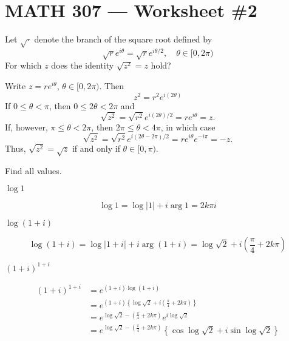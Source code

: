 \documentclass[12pt]{exam}
\begin{document}
\section*{MATH 307 --- Worksheet \#2 }

\begin{questions}
    \setlength\itemsep{1.25em}
    \setlength\parskip{1em}

    \question
    Let $\sqrt{\cdot}$ denote the branch of the square root defined by
    \[
        \sqrt re^{i\theta} = \sqrt re^{i\theta/2},\quad \theta\in [0,2\pi)
    \]
    For which $z$ does the identity $\sqrt{z^2}=z$ hold?

    \begin{solution}
        Write $z=re^{i\theta}$, $\theta\in[0,2\pi)$. Then
        \[
            z^2 = r^2e^{i(2\theta)}
        \]
        If $0\leq \theta < \pi$, then $0\leq 2\theta < 2\pi$ and
        \[
            \sqrt {z^2} = \sqrt{r^2}e^{i(2\theta)/2} = re^{i\theta}=z.
        \]
        If, however, $\pi\leq \theta < 2\pi$, then $2\pi\leq \theta < 4\pi$,
        in which case
        \[
            \sqrt {z^2} = \sqrt{r^2}e^{i(2\theta-2\pi)/2} = re^{i\theta}e^{-i\pi}=-z.
        \]
        Thus, $\sqrt{z^2}=\sqrt z$ if and only if $\theta\in [0,\pi)$.
    
    \end{solution}
    \question
    Find all values.
    \begin{parts}
        \item $\log 1$
        \begin{solution}
            \[
                \log 1 = \log |1| + i\arg 1 = 2k\pi i
            \]
        \end{solution}

        \item $\log (1+i)$
        \begin{solution}
            \[
                \log (1+i) = \log |1+i| + i\arg(1+i) = \log\sqrt 2 + i\left(\frac\pi 4 + 2k\pi\right)
            \]
        \end{solution}

        \item $(1+i)^{1+i}$
        \begin{solution}
            \begin{align*}
                (1+i)^{1+i} &= e^{(1+i)\log(1+i)}\\
                &= e^{(1+i)\left\{\log\sqrt 2 + i\left(\frac\pi 4 + 2k\pi\right)\right\}}\\
                &= e^{\log\sqrt2-\left(\frac\pi4+2k\pi\right)}e^{i\log\sqrt2}\\
                &= e^{\log\sqrt2-\left(\frac\pi4+2k\pi\right)}\left\{\cos\log\sqrt2 + i\sin\log\sqrt2\right\}
            \end{align*}
        \end{solution}
    \end{parts}


\end{questions}
\end{document}
